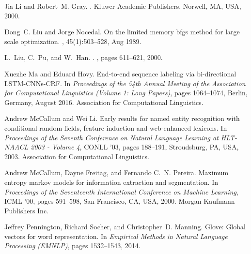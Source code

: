 \documentclass{nle}
\begin{document}
\begin{thebibliography}{}
Jia Li and Robert~M. Gray.
.
\newblock Kluwer Academic Publishers, Norwell, MA, USA, 2000.

Dong~C. Liu and Jorge Nocedal.
\newblock On the limited memory bfgs method for large scale optimization.
, 45(1):503--528, Aug 1989.

L.~Liu, C.~Pu, and W.~Han.
.
, pages 611--621, 2000.

Xuezhe Ma and Eduard Hovy.
\newblock End-to-end sequence labeling via bi-directional {LSTM}-{CNN}s-{CRF}.
\newblock In {\em Proceedings of the 54th Annual Meeting of the Association for
  Computational Linguistics (Volume 1: Long Papers)}, pages 1064--1074, Berlin,
  Germany, August 2016. Association for Computational Linguistics.

Andrew McCallum and Wei Li.
\newblock Early results for named entity recognition with conditional random
  fields, feature induction and web-enhanced lexicons.
\newblock In {\em Proceedings of the Seventh Conference on Natural Language
  Learning at HLT-NAACL 2003 - Volume 4}, CONLL '03, pages 188--191,
  Stroudsburg, PA, USA, 2003. Association for Computational Linguistics.

Andrew McCallum, Dayne Freitag, and Fernando C.~N. Pereira.
\newblock Maximum entropy markov models for information extraction and
  segmentation.
\newblock In {\em Proceedings of the Seventeenth International Conference on
  Machine Learning}, ICML '00, pages 591--598, San Francisco, CA, USA, 2000.
  Morgan Kaufmann Publishers Inc.

Jeffrey Pennington, Richard Socher, and Christopher~D. Manning.
\newblock Glove: Global vectors for word representation.
\newblock In {\em Empirical Methods in Natural Language Processing (EMNLP)},
  pages 1532--1543, 2014.


\end{thebibliography}
\end{document}
